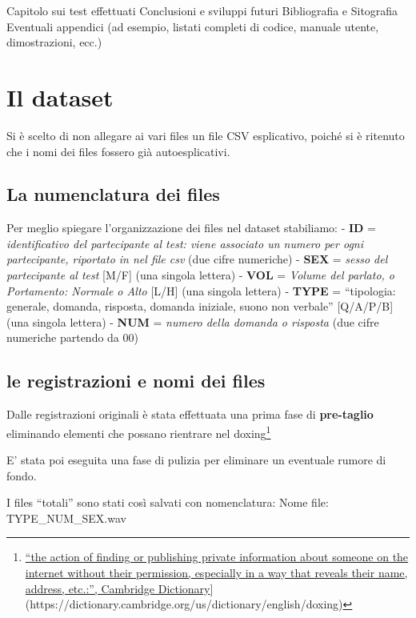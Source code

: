 \documentclass[
]{article}
\begin{document}
Capitolo sui test effettuati Conclusioni e sviluppi futuri Bibliografia e Sitografia Eventuali appendici (ad esempio, listati completi di codice, manuale utente, dimostrazioni, ecc.)

\section{Il dataset}\label{il-dataset}

Si è scelto di non allegare ai vari files un file CSV esplicativo, poiché si è ritenuto che i nomi dei files fossero già autoesplicativi.

\subsection{La numenclatura dei files}\label{la-numenclatura-dei-files}

Per meglio spiegare l'organizzazione dei files nel dataset stabiliamo: - \textbf{ID} = \emph{identificativo del partecipante al test: viene associato un numero per ogni partecipante, riportato in nel file csv} (due cifre numeriche) - \textbf{SEX} = \emph{sesso del partecipante al test} {[}M/F{]} (una singola lettera) - \textbf{VOL} = \emph{Volume del parlato, o Portamento: Normale o Alto} {[}L/H{]} (una singola lettera) - \textbf{TYPE} = ``tipologia: generale, domanda, risposta, domanda iniziale, suono non verbale'' {[}Q/A/P/B{]} (una singola lettera) - \textbf{NUM} = \emph{numero della domanda o risposta} (due cifre numeriche partendo da 00)

\subsection{le registrazioni e nomi dei files}\label{le-registrazioni-e-nomi-dei-files}

Dalle registrazioni originali è stata effettuata una prima fase di \textbf{pre-taglio} eliminando elementi che possano rientrare nel doxing\footnote{\href{\%5Bhttps://www.}{``the action of finding or publishing private information about someone on the internet without their permission, especially in a way that reveals their name, address, etc.:'', Cambridge Dictionary}{]}(https://dictionary.cambridge.org/us/dictionary/english/doxing)}

E' stata poi eseguita una fase di pulizia per eliminare un eventuale rumore di fondo.

I files ``totali'' sono stati così salvati con nomenclatura: Nome file: TYPE\_NUM\_SEX.wav
\end{document}
